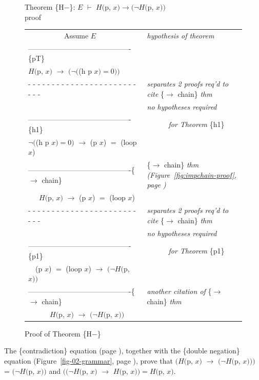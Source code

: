 \begin{figure}
Theorem \{H$-$\}: $E$ $\vdash$ $H($p, $x) \rightarrow(\neg H($p, $x))$~\\
proof
\begin{center}
\begin{tabular}{ll}
~~~~~~~~~~Assume $E$                                &\emph{hypothesis of theorem}\\
-------------------------------------------\{pT\}   &\\
$H($p, $x)$ $\rightarrow$ $(\neg($(h p $x) = 0))$   &\\
 - - - - - - - - - - - - - - - - - - - - - - - - - -&\emph{separates 2 proofs req'd to cite} \{$\rightarrow$ chain\} \emph{thm}\\
                                                    &\emph{no hypotheses required}\\
-------------------------------------------\{h1\}   &~~~~~~\emph{for Theorem} \{h1\}\\
$\neg($(h p $x)=0)$ $\rightarrow$ (p $x$) $=$ (loop $x$)&\\
-------------------------------------------\{$\rightarrow$ chain\} &\{$\rightarrow$ chain\} \emph{thm (Figure~\ref{fig:impchain-proof}, page \pageref{fig:impchain-proof})}\\
~~~$H($p, $x)$ $\rightarrow$ (p $x$) $=$ (loop $x$) &\\
 - - - - - - - - - - - - - - - - - - - - - - - - - -&\emph{separates 2 proofs req'd to cite} \{$\rightarrow$ chain\} \emph{thm}\\
                                                    &\emph{no hypotheses required}\\
-------------------------------------------\{p1\}   &~~~~~~\emph{for Theorem} \{p1\}\\
~~(p $x$) $=$ (loop $x$) $\rightarrow$ $(\neg H($p, $x))$ &\\
-------------------------------------------\{$\rightarrow$ chain\} &\emph{another citation of} \{$\rightarrow$ chain\} \emph{thm}\\
~~~~~~$H($p, $x)$ $\rightarrow$ $(\neg H($p, $x))$  &\\
\end{tabular}

\end{center}
\caption{Proof of Theorem \{H$-$\}}
\label{fig:hminus-thm-proof}
\end{figure}

The \{contradiction\} equation (page \pageref{boolean-contradiction}),
together with the \{double negation\} equation (Figure~\ref{fig-02-grammar}, page \pageref{fig-02-grammar}),
prove that $(H($p, $x)$ $\rightarrow$ $(\neg H($p, $x)))$ = $(\neg H($p, $x))$ and
$((\neg H($p, $x)$ $\rightarrow$ $H($p, $x)) = H($p, $x)$.

